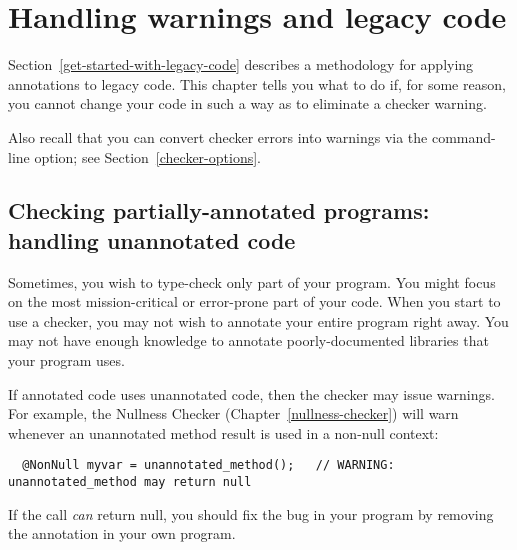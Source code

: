 \htmlhr
\chapter{Handling warnings and legacy code\label{warnings-and-legacy}}

Section~\ref{get-started-with-legacy-code} describes a methodology for
applying annotations to legacy code.  This chapter tells you what to do if,
for some reason, you cannot change your code in such a way as to eliminate
a checker warning.

Also recall that you can convert checker errors into warnings via the
 command-line option; see Section~\ref{checker-options}.


\section{Checking partially-annotated programs:  handling unannotated code\label{unannotated-code}}

Sometimes, you wish to type-check only part of your program.
You might focus on the most mission-critical or error-prone part of your
code.  When you start to use a checker, you may not wish to annotate
your entire program right away.
You may not have
enough knowledge to annotate poorly-documented libraries that your program uses.

If annotated code uses unannotated code, then the checker may issue
warnings.  For example, the Nullness Checker (Chapter~\ref{nullness-checker}) will
warn whenever an unannotated method result is used in a non-null context:

\begin{Verbatim}
  @NonNull myvar = unannotated_method();   // WARNING: unannotated_method may return null
\end{Verbatim}

If the call \emph{can} return null, you should fix the bug in your program by
removing the  annotation in your own program.

